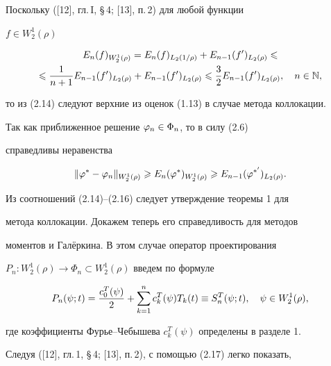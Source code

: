 Поскольку ([12], гл.\,I, \S\,4; [13], п.\,2) для любой функции


$f \in W_2^1(\rho)$


\begin{multline}


E_n(f)_{W_2^1(\rho)} = E_n(f)_{L_2(1/\rho)}+ E_{n-1}(f')_{L_2(\rho)}\lea\\


%


\lea\frac{1}{n+1}E_{n-1}(f')_{L_2(\rho)}+ E_{n-1}(f')_{L_2(\rho)}\lea


\frac{3}{2}E_{n-1}(f')_{L_2(\rho)},\quad n\in \N,


\end{multline}


то из (2.14) следуют верхние из оценок (1.13) в случае метода коллокации.





Так как приближенное решение $\varphi_n\in \Phi_n$, то в силу (2.6) 


справедливы неравенства


\begin{equation}


\|\vp^* - \vp_n\|_{W_2^1(\rho)}\gea E_n(\vp^*)_{W_2^1(\rho)}\gea


E_{n-1}(\vp^{*'})_{L_2(\rho)}.


\end{equation}





Из соотношений (2.14)--(2.16) следует утверждение теоремы 1 для 


метода коллокации. Докажем теперь его справедливость для методов 


моментов и Гал\"еркина. В этом случае оператор проектирования


$P_n:W_2^1(\rho)\to \Phi_n\subset W_2^1(\rho)$ введем по формуле


\begin{equation}


P_n(\psi;t) =\frac{c^T_0(\psi)}{2}+


\suml_{k=1}^n c_k^T(\psi)T_k(t)\equiv S_n^T(\psi;t),


\quad \psi\in W_2^1(\rho),


\end{equation}


где коэффициенты Фурье--Чебышева $c_k^T(\psi)$ определены в разделе 1. 


Следуя ([12], гл.\,1, \S\,4; [13], п.\,2), с помощью (2.17) легко показать, 


